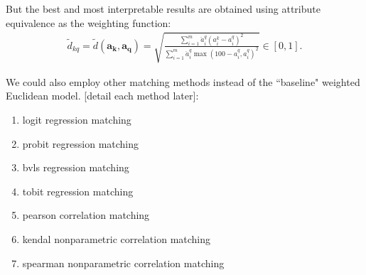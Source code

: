 \documentclass{elsarticle} %
\begin{document}
But the best and most interpretable results are obtained using attribute
equivalence as the weighting function:
\begin{gather}
    \tilde{d}_{kq} =
    \tilde{d}(\boldsymbol{a_k}, \boldsymbol{a_q}) =
    \sqrt{
    \frac{
    \sum_{i = 1}^{m}{
    \ddot{a}_{i}^{q} (a_{i}^{k} - a_{i}^{q})^2
    }
    }{
    \sum_{i = 1}^{m}{
    \ddot{a}_{i}^{q} \max(100 - a_{i}^{q}, a_{i}^{q})^2
    }
    }
    }
    \in [0,1]
    .
\end{gather}

We could also employ other matching methods instead of the ``baseline" weighted
Euclidean model. [detail each method later]:
\begin{enumerate}
    \item logit regression matching
    \item probit regression matching
    \item bvls regression matching
    \item tobit regression matching
    \item pearson correlation matching
    \item kendal nonparametric correlation matching
    \item spearman nonparametric correlation matching
\end{enumerate}
\end{document}
